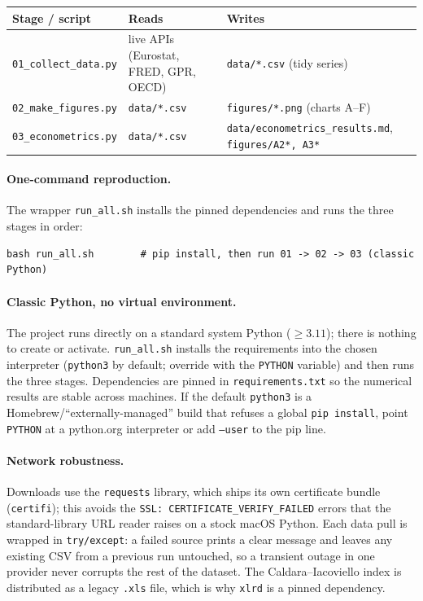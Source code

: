 \documentclass[11pt,a4paper]{article}
\newcommand{\code}[1]{\texttt{#1}}
\begin{document}
\begin{center}
\renewcommand{\arraystretch}{1.25}
\begin{tabular}{@{}p{4.4cm} p{4.0cm} p{6.2cm}@{}}
\toprule
\textbf{Stage / script} & \textbf{Reads} & \textbf{Writes} \\
\midrule
\code{01\_collect\_data.py} & live APIs (Eurostat, FRED, GPR, OECD) &
  \code{data/*.csv} (tidy series) \\
\code{02\_make\_figures.py} & \code{data/*.csv} &
  \code{figures/*.png} (charts A--F) \\
\code{03\_econometrics.py} & \code{data/*.csv} &
  \code{data/econometrics\_results.md}, \code{figures/A2*, A3*} \\
\bottomrule
\end{tabular}
\end{center}

\paragraph{One-command reproduction.} The wrapper \code{run\_all.sh} installs the
pinned dependencies and runs the three stages in order:
\begin{lstlisting}
bash run_all.sh        # pip install, then run 01 -> 02 -> 03 (classic Python)
\end{lstlisting}

\paragraph{Classic Python, no virtual environment.} The project runs directly on
a standard system Python ($\ge 3.11$); there is nothing to create or activate.
\code{run\_all.sh} installs the requirements into the chosen interpreter
(\code{python3} by default; override with the \code{PYTHON} variable) and then
runs the three stages. Dependencies are pinned in \code{requirements.txt} so the
numerical results are stable across machines. If the default \code{python3} is a
Homebrew/``externally-managed'' build that refuses a global \code{pip install},
point \code{PYTHON} at a python.org interpreter or add \code{--user} to the pip
line.

\paragraph{Network robustness.} Downloads use the \code{requests} library, which
ships its own certificate bundle (\code{certifi}); this avoids the
\code{SSL: CERTIFICATE\_VERIFY\_FAILED} errors that the standard-library URL
reader raises on a stock macOS Python. Each data pull is wrapped in
\code{try/except}: a failed source prints a clear message and leaves any existing
CSV from a previous run untouched, so a transient outage in one provider never
corrupts the rest of the dataset. The Caldara--Iacoviello index is distributed
as a legacy \code{.xls} file, which is why \code{xlrd} is a pinned dependency.
\end{document}
